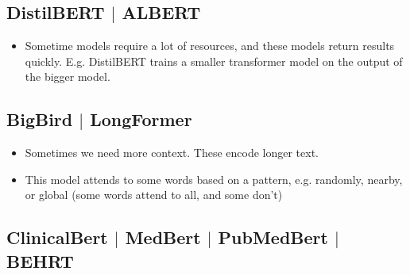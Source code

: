 \documentclass[11pt]{article}
\begin{document}
\subsection{DistilBERT $\vert$ ALBERT}

\begin{minipage}[l]{.5\linewidth}
    \begin{figure}[H]
        \centering
    \end{figure}    
\end{minipage}\hfill
\begin{minipage}[r]{.48\linewidth}
    \begin{itemize}
        \item Sometime models require a lot of resources, and these models return results quickly. E.g. DistilBERT trains a smaller transformer model on the output of the bigger model. 
    \end{itemize}
\end{minipage}

\subsection{BigBird $\vert$ LongFormer}

\begin{minipage}[l]{.5\linewidth}
    \begin{figure}[H]
        \centering
    \end{figure}    
\end{minipage}\hfill
\begin{minipage}[r]{.48\linewidth}
    \begin{itemize}
        \item Sometimes we need more context. These encode longer text. 
        \item This model attends to some words based on a pattern, e.g. randomly, nearby, or global (some words attend to all, and some don't)
    \end{itemize}
\end{minipage}

\subsection{ClinicalBert $\vert$ MedBert $\vert$ PubMedBert $\vert$ BEHRT}
\end{document}
